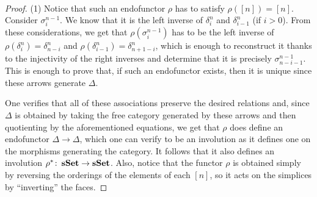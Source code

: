\documentclass[a4paper,11pt,openany]{scrartcl}
\begin{document}
~\\
\begin{proof}
    (1) Notice that such an endofunctor $\rho$ has to satisfy $\rho([n])=[n]$.
    Consider $\sigma^{n-1}_i$. We know that it is the left inverse of
    $\delta^n_i$ and $\delta^n_{i-1}$ (if $i>0$). From these considerations, we
    get that $\rho(\sigma^{n-1}_i)$ has to be the left inverse of
    $\rho(\delta^n_i)=\delta^n_{n-i}$ and
    $\rho(\delta^n_{i-1})=\delta^n_{n+1-i}$, which is enough to reconstruct it
    thanks to the injectivity of the right inverses and determine that it is
    precisely $\sigma^{n-1}_{n-i-1}$. This is enough to prove that, if such an
    endofunctor exists, then it is unique since these arrows generate $\Delta$.

    One verifies that all of these associations preserve the desired relations
    and, since $\Delta$ is obtained by taking the free category generated by
    these arrows and then quotienting by the aforementioned equations, we get
    that $\rho$ does define an endofunctor $\Delta\rightarrow\Delta$, which one
    can verify to be an involution as it defines one on the morphisms
    generating the category. It follows that it also defines an involution
    $\rho^*\colon\operatorname{\mathbf{sSet}}\rightarrow\operatorname{\mathbf{sSet}}$. Also, notice that the functor $\rho$ is
    obtained simply by reversing the orderings of the elements of each $[n]$, so
    it acts on the simplices by ``inverting'' the faces.


\end{proof}
\end{document}
